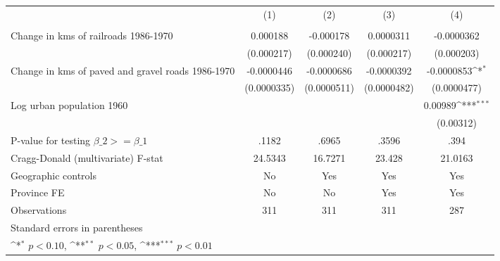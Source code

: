 {
\def\sym#1{\ifmmode^{#1}\else\(^{#1}\)\fi}
\begin{tabular}{l*{4}{c}}
\hline\hline
                &\multicolumn{1}{c}{(1)}&\multicolumn{1}{c}{(2)}&\multicolumn{1}{c}{(3)}&\multicolumn{1}{c}{(4)}\\
                &\multicolumn{1}{c}{}&\multicolumn{1}{c}{}&\multicolumn{1}{c}{}&\multicolumn{1}{c}{}\\
\hline
Change in kms of railroads 1986-1970& 0.000188         &-0.000178         &0.0000311         &-0.0000362         \\
                &(0.000217)         &(0.000240)         &(0.000217)         &(0.000203)         \\
[1em]
Change in kms of paved and gravel roads 1986-1970&-0.0000446         &-0.0000686         &-0.0000392         &-0.0000853\sym{*}  \\
                &(0.0000335)         &(0.0000511)         &(0.0000482)         &(0.0000477)         \\
[1em]
Log urban population 1960&                  &                  &                  &  0.00989\sym{***}\\
                &                  &                  &                  &(0.00312)         \\
\hline
P-value for testing $\beta\_{2} >= \beta\_{1}$&    .1182         &    .6965         &    .3596         &     .394         \\
Cragg-Donald (multivariate) F-stat&  24.5343         &  16.7271         &   23.428         &  21.0163         \\
Geographic controls&       No         &      Yes         &      Yes         &      Yes         \\
Province FE     &       No         &       No         &      Yes         &      Yes         \\
Observations    &      311         &      311         &      311         &      287         \\
\hline\hline
\multicolumn{5}{l}{\footnotesize Standard errors in parentheses}\\
\multicolumn{5}{l}{\footnotesize \sym{*} \(p<0.10\), \sym{**} \(p<0.05\), \sym{***} \(p<0.01\)}\\
\end{tabular}
}
